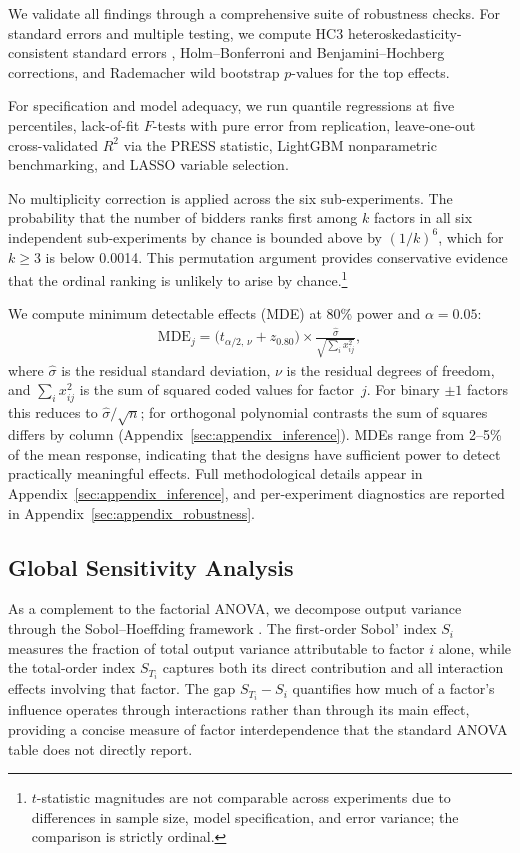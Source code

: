 We validate all findings through a comprehensive suite of robustness checks. For standard errors and multiple testing, we compute HC3 heteroskedasticity-consistent standard errors \citep{MacKinnonWhite1985}, Holm--Bonferroni and Benjamini--Hochberg corrections, and Rademacher wild bootstrap $p$-values for the top effects.

For specification and model adequacy, we run quantile regressions at five percentiles, lack-of-fit $F$-tests with pure error from replication, leave-one-out cross-validated $R^2$ via the PRESS statistic, LightGBM nonparametric benchmarking, and LASSO variable selection.

No multiplicity correction is applied across the six sub-experiments. The probability that the number of bidders ranks first among $k$ factors in all six independent sub-experiments by chance is bounded above by $(1/k)^6$, which for $k \geq 3$ is below 0.0014. This permutation argument provides conservative evidence that the ordinal ranking is unlikely to arise by chance.\footnote{$t$-statistic magnitudes are not comparable across experiments due to differences in sample size, model specification, and error variance; the comparison is strictly ordinal.}

We compute minimum detectable effects (MDE) at 80\% power and $\alpha = 0.05$:
\begin{align}
  \text{MDE}_{j} = \bigl(t_{\alpha/2,\,\nu} + z_{0.80}\bigr) \times \frac{\hat{\sigma}}{\sqrt{\sum_{i} x_{ij}^{2}}},
  \label{eq:mde}
\end{align}
where $\hat{\sigma}$ is the residual standard deviation, $\nu$ is the residual degrees of freedom, and $\sum_{i} x_{ij}^{2}$ is the sum of squared coded values for factor~$j$. For binary $\pm 1$ factors this reduces to $\hat{\sigma}/\sqrt{n}$; for orthogonal polynomial contrasts the sum of squares differs by column (Appendix~\ref{sec:appendix_inference}). MDEs range from 2--5\% of the mean response, indicating that the designs have sufficient power to detect practically meaningful effects. Full methodological details appear in Appendix~\ref{sec:appendix_inference}, and per-experiment diagnostics are reported in Appendix~\ref{sec:appendix_robustness}.

\subsection{Global Sensitivity Analysis}

As a complement to the factorial ANOVA, we decompose output variance through the Sobol--Hoeffding framework \citep{Sobol2001}. The first-order Sobol' index $S_i$ measures the fraction of total output variance attributable to factor $i$ alone, while the total-order index $S_{T_i}$ captures both its direct contribution and all interaction effects involving that factor. The gap $S_{T_i} - S_i$ quantifies how much of a factor's influence operates through interactions rather than through its main effect, providing a concise measure of factor interdependence that the standard ANOVA table does not directly report.

